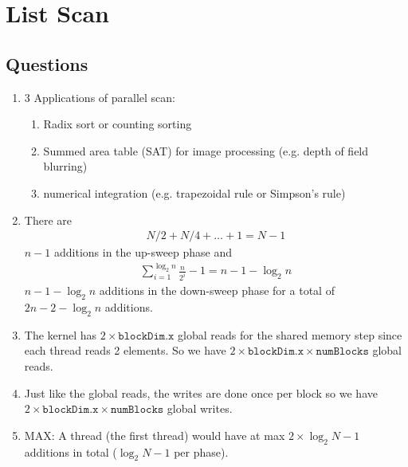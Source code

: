 \documentclass[../main.tex]{subfiles}
\begin{document}
\pagestyle{fancy}


\renewcommand{\thefigure}{\arabic{figure}}
\section*{List Scan}

\subsection*{Questions}

\begin{enumerate}
    \item 3 Applications of parallel scan:
    \begin{enumerate}
        \item Radix sort or counting sorting
        \item Summed area table (SAT) for image processing (e.g. depth of field blurring)
        \item numerical integration (e.g. trapezoidal rule or Simpson's rule)
    \end{enumerate}

    \item There are 
    \begin{align*}
        N/2 + N/4 + \ldots + 1 = N - 1
    \end{align*}
    $n - 1$ additions in the up-sweep phase and 
    \begin{align*}
        \sum_{i = 1}^{\log_2{n}} \frac{n}{2^i} - 1 = n - 1 - \log_2{n}
    \end{align*}
    $n - 1 - \log_2{n}$ additions in the
    down-sweep phase for a total of $2n - 2 - \log_2{n}$ additions.
 
    \item The kernel has $2 \times \texttt{blockDim.x}$ global reads for the shared
    memory step since each thread reads 2 elements. So we have
    $2 \times \texttt{blockDim.x} \times \texttt{numBlocks}$ global reads.

    \item Just like the global reads, the writes are done once per block so we have
    $2 \times \texttt{blockDim.x} \times \texttt{numBlocks}$ global writes.

    \item MAX: A thread (the first thread) would have at max
    $2 \times \log_2{N} - 1$ additions in total ($\log_2{N} - 1$ per phase).


\end{enumerate}
\end{document}

